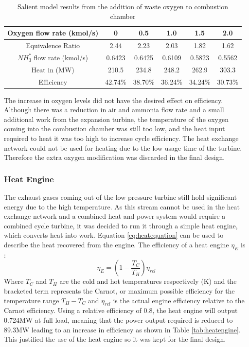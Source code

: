 \begin {table} [h]
\begin{center}
\caption{Salient model results from the addition of waste oxygen to combustion chamber} \label{tab:extraox} 
\begin{tabular}{ |c|c|c|c|c|c| }
 \hline
  Oxygen flow rate (kmol/s) & 0 & 0.5 & 1.0 & 1.5 & 2.0\\ 
   \hline
  Equivalence Ratio & 2.44 & 2.23 & 2.03 & 1.82 & 1.62\\
    \hline
  $NH_3^*$ flow rate (kmol/s) & 0.6423 & 0.6425 & 0.6109 & 0.5823 & 0.5562\\ 
    \hline
  Heat in (MW) & 210.5 & 234.8 & 248.2 & 262.9 & 303.3 \\
  \hline
  Efficiency &42.74\% & 38.70\% & 36.24\% & 34.24\% & 30.73\% \\ 
 \hline
\end{tabular}
\end{center}  
\end {table} 
The increase in oxygen levels did not have the desired effect on efficiency. Although there was a reduction in air and ammonia flow rate and a small additional work from the expansion turbine, the temperature of the oxygen coming into the combustion chamber was still too low, and the heat input required to heat it was too high to increase cycle efficiency. The heat exchange network could not be used for heating due to the low usage time of the turbine. Therefore the extra oxygen modification was discarded in the final design.


\subsubsection{Heat Engine}
The exhaust gases coming out of the low pressure turbine still hold significant energy due to the high temperature. As this stream cannot be used in the heat exchange network and a combined heat and power system would require a combined cycle turbine, it was decided to run it through a simple heat engine, which converts heat into work. Equation \ref{eq:heatequation} can be used to describe the heat recovered from the engine. The efficiency of a heat engine $\eta_E$ is \cite{thermonotes}:
\begin{equation}
\eta_E = \left(1 - \frac{T_C}{T_H}\right) \eta_{rel} 
\end{equation}
Where $T_C$ and $T_H$ are the cold and hot temperatures respectively (K) and the bracketed term represents the Carnot, or maximum possible efficiency for the temperature range $T_H - T_C$ and $\eta_{rel}$ is the actual engine efficiency relative to the Carnot efficiency. Using a relative efficiency of 0.8, the heat engine will output 0.724MW at full load, meaning that the power output required is reduced to 89.3MW leading to an increase in efficiency as shown in Table \ref{tab:heatengine}. This justified the use of the heat engine so it was kept for the final design.

